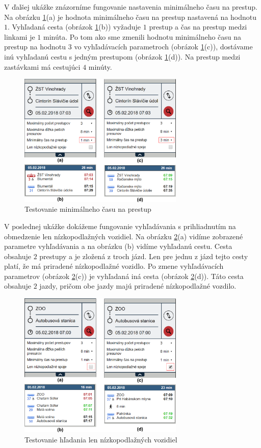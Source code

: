 V ďalšej ukážke znázorníme fungovanie nastavenia minimálneho času na prestup. Na obrázku \ref{fig:test-min-transfer}(a) je hodnota minimálneho času na prestup nastavená na hodnotu $1$. Vyhľadaná cesta (obrázok \ref{fig:test-min-transfer}(b)) vyžaduje $1$ prestup a čas na prestup medzi linkami je $1$ minúta. Po tom ako sme zmenili hodnotu minimálneho času na prestup na hodnotu $3$ vo vyhľadávacích parametroch (obrázok \ref{fig:test-min-transfer}(c)), dostávame inú vyhľadanú cestu s jedným prestupom (obrázok \ref{fig:test-min-transfer}(d)). Na prestup medzi zastávkami má cestujúci $4$ minúty.

\begin{figure}[H]
\centerline{\includegraphics[width=0.7\textwidth]{images/test/min-transfer}}
\caption[Testovanie minimálneho času na prestup]{Testovanie minimálneho času na prestup}
\label{fig:test-min-transfer}
\end{figure}

V poslednej ukážke dokážeme fungovanie vyhľadávania s prihliadnutím na obmedzenie len nízkopodlažných vozidiel. Na obrázku \ref{fig:test-low-floor}(a) vidíme zobrazené parametre vyhľadávania a na obrázku (b) vidíme vyhľadanú cestu. Cesta obsahuje $2$ prestupy a je zložená z troch jázd. Len pre jednu z jázd tejto cesty platí, že má priradené nízkopodlažné vozidlo. Po zmene vyhľadávacích parametrov (obrázok \ref{fig:test-low-floor}(c)) je vyhľadaná iná cesta (obrázok \ref{fig:test-low-floor}(d)). Táto cesta obsahuje $2$ jazdy, pričom obe jazdy majú priradené nízkopodlažné vozdilo.

\begin{figure}[H]
\centerline{\includegraphics[width=0.7\textwidth]{images/test/low-floor}}
\caption[Testovanie hľadania len nízkopodlažných vozidiel]{Testovanie hľadania len nízkopodlažných vozidiel}
\label{fig:test-low-floor}
\end{figure}





